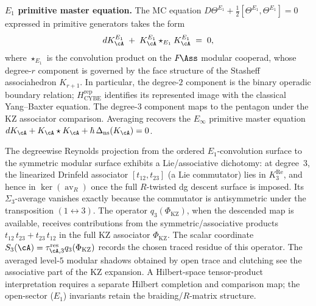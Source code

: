 \begin{remark}
\medskip
\noindent\textbf{$E_1$ primitive master equation.}
The MC equation $D\Theta^{E_1} + \tfrac{1}{2}[\Theta^{E_1},
\Theta^{E_1}] = 0$ expressed in primitive generators takes the form
\begin{equation}
\label{eq:e1-primitive-master-equation}
dK_\cA^{E_1}
\;+\;
K_\cA^{E_1} \star_{E_1} K_\cA^{E_1}
\;=\; 0,
\end{equation}
where $\star_{E_1}$ is the convolution product on the $F\!\Ass$
modular cooperad, whose degree-$r$ component is governed by the face
structure of the Stasheff associahedron $K_{r+1}$. In particular,
the degree-$2$ component is the binary operadic boundary relation;
$H_{\mathrm{CYBE}}^{\mathrm{rep}}$ identifies its represented image
with the classical Yang--Baxter equation.  The degree-$3$ component
maps to the pentagon under the KZ associator comparison. Averaging
recovers the $E_\infty$ primitive master equation
$dK_\cA + K_\cA \star K_\cA
+ \hbar\,\Delta_{\mathrm{ns}}(K_\cA) = 0$.
\end{remark}

\begin{remark}
\label{rem:lie-associative-dichotomy}
The degreewise Reynolds projection from the ordered
$E_1$-convolution surface to the symmetric modular surface exhibits a
Lie/associative dichotomy: at degree~$3$, the linearized Drinfeld
associator $[t_{12}, t_{23}]$ (a Lie commutator) lies in
\(K^{\mathrm{Re}}_3\), and hence in \(\ker(\operatorname{av}_R)\)
once the full $R$-twisted dg descent surface is imposed. Its
$\Sigma_3$-average vanishes exactly because the commutator is
antisymmetric under the transposition $(1 \leftrightarrow 3)$.
The operator $q_3(\Phi_{\mathrm{KZ}})$, when the descended map is
available, receives contributions from
the symmetric/associative products
$t_{12}\, t_{23} + t_{23}\, t_{12}$ in the full KZ associator
$\Phi_{\mathrm{KZ}}$.  The scalar coordinate
$S_3(\cA)=\tau_{\cA,3}^{\mathrm{res}}q_3(\Phi_{\mathrm{KZ}})$ records
the chosen traced residue of this operator.
The averaged level-$5$ modular shadows obtained by open trace and
clutching see the associative part of the KZ expansion. A Hilbert-space
tensor-product interpretation requires a separate Hilbert completion
and comparison map; the open-sector ($E_1$) invariants retain the
braiding/$R$-matrix structure.
\end{remark}

